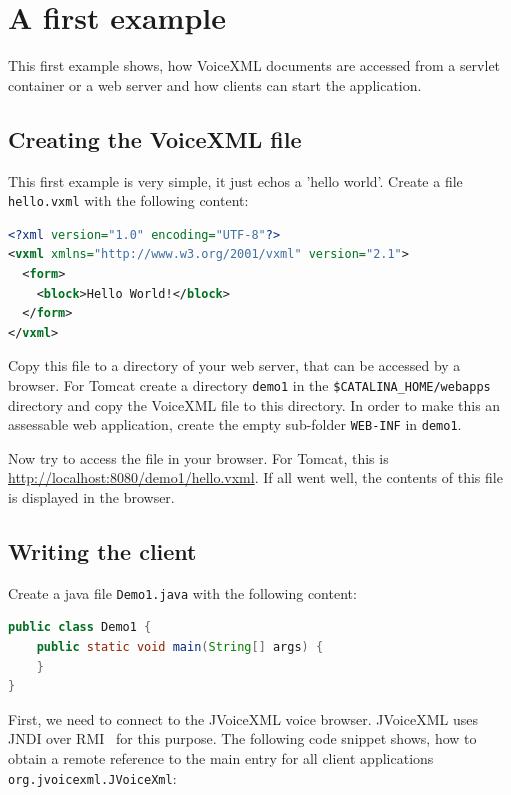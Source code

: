 \documentclass[11pt,a4paper]{article}
\begin{document}
\section{A first example}

This first example shows, how VoiceXML documents are accessed from a
servlet container or a web server and how clients can start the application.

\subsection{Creating the VoiceXML file}

This first example is very simple, it just echos a 'hello world'.
Create a file \texttt{hello.vxml} with the following content:

\begin{lstlisting}[language=XML]
<?xml version="1.0" encoding="UTF-8"?> 
<vxml xmlns="http://www.w3.org/2001/vxml" version="2.1">
  <form>
    <block>Hello World!</block>
  </form>
</vxml>
\end{lstlisting}

Copy this file to a directory of your web server, that can be accessed
by a browser. For Tomcat create a directory \texttt{demo1} in
the \texttt{\$CATALINA\_HOME/webapps} directory and copy the VoiceXML
file to this directory. In order to make this
an assessable web application, create the empty sub-folder \texttt{WEB-INF}
in \texttt{demo1}.

Now try to access the file in your browser. For Tomcat, this is
\url{http://localhost:8080/demo1/hello.vxml}. If all went well, the
contents of this file is displayed in the browser.

\subsection{Writing the client}

Create a java file \texttt{Demo1.java} with the following content:

\begin{lstlisting}[language=Java]
public class Demo1 {
    public static void main(String[] args) {
    }
}
\end{lstlisting}

First, we need to connect to the JVoiceXML voice browser. JVoiceXML
uses JNDI over RMI~\cite{sun:rmi,sun:rmi_jndi} for this purpose. 
The following code snippet
shows, how to obtain a remote reference to the main entry for
all client applications \texttt{org.jvoicexml.JVoiceXml}:
\end{document}
